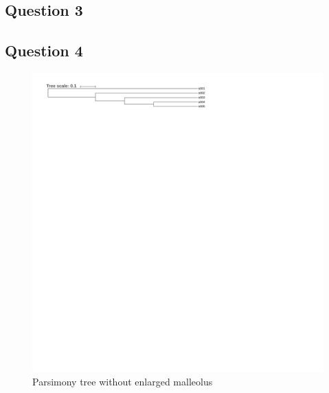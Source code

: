 \documentclass[]{article}
\theoremstyle{definition}
\begin{document}
\subsection{Question 3}



\subsection{Question 4}

\begin{figure}[h!]
	\includegraphics*[width = \linewidth]{image/tree_1_true.pdf}
	\caption{\label{nj2} Parsimony tree without enlarged malleolus }
\end{figure}
\end{document}
